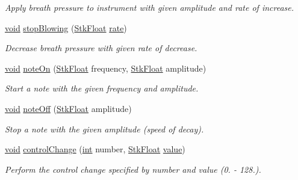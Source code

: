 \begin{DoxyCompactItemize}
\begin{DoxyCompactList}\small\item\em Apply breath pressure to instrument with given amplitude and rate of increase. \end{DoxyCompactList}\item 
\hyperlink{sound_8c_ae35f5844602719cf66324f4de2a658b3}{void} \hyperlink{class_nyq_1_1_saxofony_ac7fa1899d91b932fc7b399ea854a59ae}{stop\+Blowing} (\hyperlink{namespace_nyq_a044fa20a706520a617bbbf458a7db7e4}{Stk\+Float} \hyperlink{seqread_8c_ad89d3fac2deab7a9cf6cfc8d15341b85}{rate})
\begin{DoxyCompactList}\small\item\em Decrease breath pressure with given rate of decrease. \end{DoxyCompactList}\item 
\hyperlink{sound_8c_ae35f5844602719cf66324f4de2a658b3}{void} \hyperlink{class_nyq_1_1_saxofony_a26faae76359ccfce8de4b8eaf6fdde48}{note\+On} (\hyperlink{namespace_nyq_a044fa20a706520a617bbbf458a7db7e4}{Stk\+Float} frequency, \hyperlink{namespace_nyq_a044fa20a706520a617bbbf458a7db7e4}{Stk\+Float} amplitude)
\begin{DoxyCompactList}\small\item\em Start a note with the given frequency and amplitude. \end{DoxyCompactList}\item 
\hyperlink{sound_8c_ae35f5844602719cf66324f4de2a658b3}{void} \hyperlink{class_nyq_1_1_saxofony_a8ddced8b49539c214178b2b6eb505022}{note\+Off} (\hyperlink{namespace_nyq_a044fa20a706520a617bbbf458a7db7e4}{Stk\+Float} amplitude)
\begin{DoxyCompactList}\small\item\em Stop a note with the given amplitude (speed of decay). \end{DoxyCompactList}\item 
\hyperlink{sound_8c_ae35f5844602719cf66324f4de2a658b3}{void} \hyperlink{class_nyq_1_1_saxofony_a8a9d0ba653de585fc43ea16b9f8f5764}{control\+Change} (\hyperlink{xmltok_8h_a5a0d4a5641ce434f1d23533f2b2e6653}{int} number, \hyperlink{namespace_nyq_a044fa20a706520a617bbbf458a7db7e4}{Stk\+Float} \hyperlink{lib_2expat_8h_a4a30a13b813682e68c5b689b45c65971}{value})
\begin{DoxyCompactList}\small\item\em Perform the control change specified by {\itshape number} and {\itshape value} (0. -\/ 128.). \end{DoxyCompactList}\end{DoxyCompactItemize}
